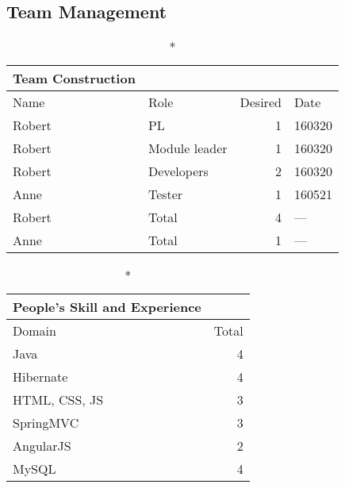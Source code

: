 \documentclass[a4paper,11pt]{article}
\begin{document}
\subsection{Team Management}
\begin{center}
\begin{longtable}{|l|l|r|l|}
\caption*{Team Construction} \\
\hline Name   & Role          & Desired & Date \\
\hline Robert & PL            & 1       & 160320 \\
\hline Robert & Module leader & 1       & 160320 \\
\hline Robert & Developers    & 2       & 160320 \\
\hline Anne   & Tester        & 1       & 160521 \\
\hline Robert & Total         & 4       & --- \\
\hline Anne   & Total         & 1       & --- \\
\hline
\end{longtable}

\begin{longtable}{|l|r|}
\caption*{People's Skill and Experience} \\
\hline Domain        & Total \\
\hline Java          & 4 \\
\hline Hibernate     & 4 \\
\hline HTML, CSS, JS & 3 \\
\hline SpringMVC     & 3 \\
\hline AngularJS     & 2 \\
\hline MySQL         & 4 \\
\hline
\end{longtable}
\end{center}
\end{document}

